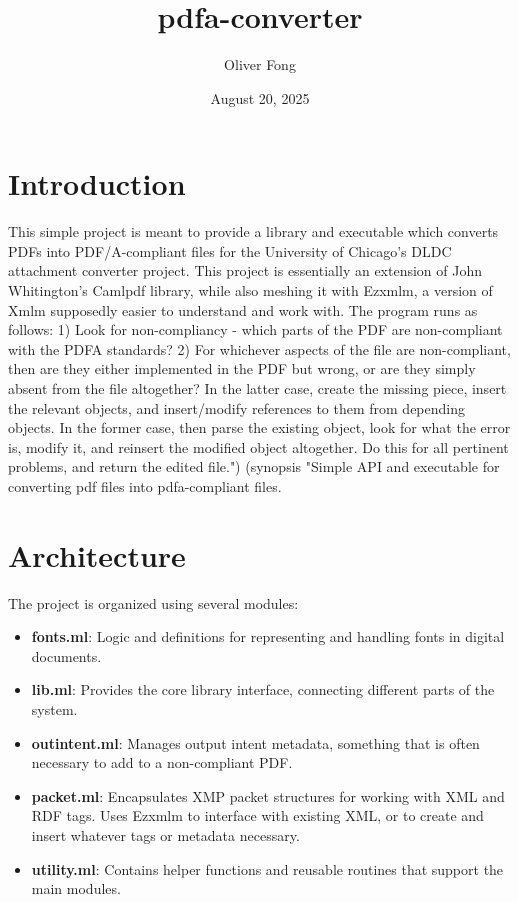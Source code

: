 \documentclass[11pt]{article}
\title{pdfa-converter}
\author{Oliver Fong}
\date{August 20, 2025}
\begin{document}
\maketitle

\section*{Introduction}
This simple project is meant to provide a library and executable which converts PDFs
into PDF/A-compliant files for the University of Chicago's DLDC attachment converter project.
This project is essentially an extension of John Whitington's Camlpdf library, while also
meshing it with Ezxmlm, a version of Xmlm supposedly easier to understand and work with.
The program runs as follows: 1) Look for non-compliancy - which parts of the PDF are non-compliant
with the PDFA standards? 2) For whichever aspects of the file are non-compliant, then are they
either implemented in the PDF but wrong, or are they simply absent from the file altogether? In 
the latter case, create the missing piece, insert the relevant objects, and insert/modify references to them from
depending objects. In the former case, then parse the existing object, look for what the error is, modify it, and
reinsert the modified object altogether. Do this for all pertinent problems, and return the edited file.")
 (synopsis "Simple API and executable for converting pdf files into pdfa-compliant files.

\section*{Architecture}
The project is organized using several modules:
\begin{itemize}
  \item \textbf{fonts.ml}: Logic and definitions for representing and handling fonts in digital documents.
  \item \textbf{lib.ml}: Provides the core library interface, connecting different parts of the system.
  \item \textbf{outintent.ml}: Manages output intent metadata, something that is often necessary to add to a non-compliant PDF.
  \item \textbf{packet.ml}: Encapsulates XMP packet structures for working with XML and RDF tags. Uses Ezxmlm to interface with existing XML, or to create and insert whatever tags or metadata necessary.
  \item \textbf{utility.ml}: Contains helper functions and reusable routines that support the main modules.
\end{itemize}
\end{document}
